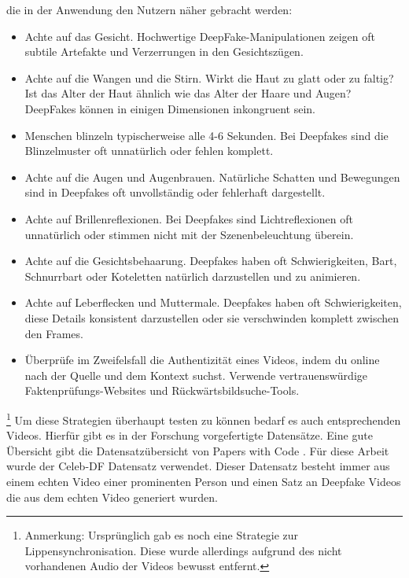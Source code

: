 die in der Anwendung den Nutzern näher gebracht werden:
\begin{itemize}
    \item Achte auf das Gesicht. Hochwertige DeepFake-Manipulationen zeigen oft subtile Artefakte und Verzerrungen in den Gesichtszügen.
    \item Achte auf die Wangen und die Stirn. Wirkt die Haut zu glatt oder zu faltig? 
        Ist das Alter der Haut ähnlich wie das Alter der Haare und Augen? DeepFakes können in einigen Dimensionen inkongruent sein.
    \item Menschen blinzeln typischerweise alle 4-6 Sekunden. Bei Deepfakes sind die Blinzelmuster oft unnatürlich oder fehlen komplett.
    \item Achte auf die Augen und Augenbrauen. Natürliche Schatten und Bewegungen sind in Deepfakes oft unvollständig oder fehlerhaft dargestellt.
    \item Achte auf Brillenreflexionen. Bei Deepfakes sind Lichtreflexionen oft unnatürlich oder stimmen nicht mit der Szenenbeleuchtung überein.
    \item Achte auf die Gesichtsbehaarung. Deepfakes haben oft Schwierigkeiten, Bart, Schnurrbart oder Koteletten natürlich darzustellen und zu animieren.
    \item Achte auf Leberflecken und Muttermale. Deepfakes haben oft Schwierigkeiten, diese Details konsistent darzustellen oder sie verschwinden komplett zwischen den Frames.
    \item Überprüfe im Zweifelsfall die Authentizität eines Videos, 
        indem du online nach der Quelle und dem Kontext suchst. Verwende vertrauenswürdige Faktenprüfungs-Websites und Rückwärtsbildsuche-Tools.
\end{itemize}
\footnote{Anmerkung: Ursprünglich gab es noch eine Strategie zur Lippensynchronisation. 
Diese wurde allerdings aufgrund des nicht vorhandenen Audio der Videos bewusst entfernt.}
Um diese Strategien überhaupt testen zu können bedarf es auch entsprechenden Videos. 
Hierfür gibt es in der Forschung vorgefertigte Datensätze. 
Eine gute Übersicht gibt die Datensatzübersicht von Papers with Code \cite{PapersCodeMachine}. 
Für diese Arbeit wurde der Celeb-DF Datensatz verwendet. 
Dieser Datensatz besteht immer aus einem echten Video einer prominenten Person und einen Satz an Deepfake Videos die aus dem echten Video generiert wurden.



